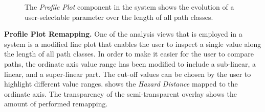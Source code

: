 \begin{figure}
\centering
{}
\caption{The \emph{Profile Plot} component in the system shows the evolution of a user-selectable parameter over the length of all path classes.}
\label{contributions:usar:rendering:profile}
\end{figure}

\textbf{Profile Plot Remapping.}  One of the analysis views that is employed in a system is a modified line plot that enables the user to inspect a single value along the length of all path classes.  In order to make it easier for the user to compare paths, the ordinate axis value range has been modified to include a sub-linear, a linear, and a super-linear part.  The cut-off values can be chosen by the user to highlight different value ranges.   shows the \emph{Hazard Distance} mapped to the ordinate axis.  The transparency of the semi-transparent overlay shows the amount of performed remapping.

